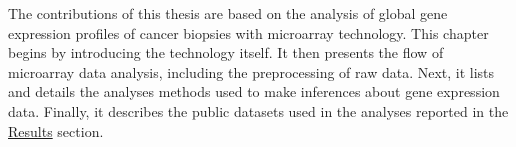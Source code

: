 The contributions of this thesis are based on the analysis of global gene
expression profiles of cancer biopsies with microarray technology.  This chapter
begins by introducing the technology itself.  It then presents the flow of
microarray data analysis, including the preprocessing of raw data.  Next, it
lists and details the analyses methods used to make inferences about gene
expression data. Finally, it describes the public datasets used in the analyses
reported in the \hyperref[chap:results]{\textsf{Results}} section.





